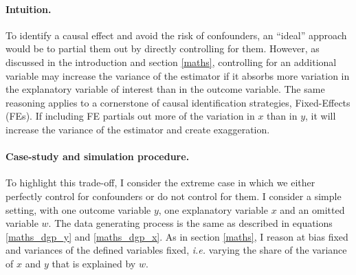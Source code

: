 \documentclass[usletter, 12pt]{article}
\begin{document}
     			\paragraph{Intuition.} To identify a causal effect and avoid the risk of confounders, an ``ideal'' approach would be to partial them out by directly controlling for them. %
			However, as discussed in the introduction and section \ref{maths}, controlling for an additional variable may increase the variance of the estimator if it absorbs more variation in the explanatory variable of interest than in the outcome variable.
			The same reasoning applies to a cornerstone of causal identification strategies, Fixed-Effects (FEs). If including FE partials out more of the variation in $x$ than in $y$, it will increase the variance of the estimator and create exaggeration. 
			
			\paragraph{Case-study and simulation procedure.} To highlight this trade-off, I consider the extreme case in which we either perfectly control for confounders or do not control for them. %
			I consider a simple setting, with one outcome variable $y$, one explanatory variable $x$ and an omitted variable $w$. The data generating process is the same as described in equations \ref{maths_dgp_y} and \ref{maths_dgp_x}. As in section \ref{maths}, I reason at bias fixed and variances of the defined variables fixed, \textit{i.e.} varying the share of the variance of $x$ and $y$ that is explained by $w$.
        
\end{document}
